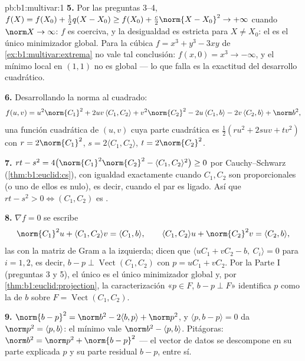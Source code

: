 \begin{solution}{pb:b1:multivar:1}
\textbf{5.} Por las preguntas 3--4, $f(X) = f(X_0) + \frac12 q(X -
X_0) \geq f(X_0) + \frac c2\norm{X - X_0}^2 \to +\infty$ cuando
$\norm X \to \infty$: $f$ es coerciva, y la desigualdad es
estricta para $X \neq X_0$: el  es el único minimizador
global. Para la cúbica $f = x^3 + y^3 - 3xy$ de
\cref{ex:b1:multivar:extrema} no vale tal conclusión: $f(x,0)
= x^3 \to -\infty$, y el mínimo local en $(1,1)$ no es
global --- lo que falla es la exactitud del desarrollo cuadrático.

\textbf{6.} Desarrollando la norma al cuadrado:
\[
f(u,v) = u^2\norm{C_1}^2 + 2uv\,\langle C_1, C_2\rangle +
v^2\norm{C_2}^2 - 2u\,\langle C_1, b\rangle - 2v\,\langle C_2,
b\rangle + \norm b^2 ,
\]
una función cuadrática de $(u, v)$ cuya parte cuadrática es
$\frac12(ru^2 + 2suv + tv^2)$ con $r = 2\norm{C_1}^2$, $s =
2\langle C_1, C_2\rangle$, $t = 2\norm{C_2}^2$.

\textbf{7.} $rt - s^2 = 4\bigl(\norm{C_1}^2\norm{C_2}^2 -
\langle C_1, C_2\rangle^2\bigr) \geq 0$ por Cauchy--Schwarz
(\cref{thm:b1:euclid:cs}), con igualdad exactamente cuando $C_1, C_2$
son proporcionales (o uno de ellos es nulo), es decir, cuando el par es
ligado. Así que $rt - s^2 > 0 \iff (C_1, C_2)$ es .

\textbf{8.} $\nabla f = 0$ se escribe
\[
\norm{C_1}^2 u + \langle C_1, C_2\rangle v = \langle C_1,
b\rangle,
\qquad
\langle C_1, C_2\rangle u + \norm{C_2}^2 v = \langle C_2,
b\rangle,
\]
las  con la matriz de Gram a la izquierda; dicen que
$\langle uC_1 + vC_2 - b,\ C_i\rangle = 0$ para $i = 1, 2$, es decir,
$b - p \perp \operatorname{Vect}(C_1, C_2)$ con $p = uC_1 +
vC_2$. Por la Parte I (preguntas 3 y 5), el único  es
el único minimizador global y, por
\cref{thm:b1:euclid:projection}, la caracterización «$p \in
F$, $b - p \perp F$» identifica $p$ como la  de $b$ sobre $F = \operatorname{Vect}(C_1, C_2)$.

\textbf{9.} $\norm{b - p}^2 = \norm b^2 - 2\langle b, p\rangle +
\norm p^2$, y $\langle p, b - p\rangle = 0$ da $\norm p^2 =
\langle p, b\rangle$: el mínimo vale $\norm b^2 - \langle p,
b\rangle$. Pitágoras: $\norm b^2 = \norm p^2 + \norm{b - p}^2$
--- el vector de datos se descompone en su parte explicada $p$ y su
parte residual $b - p$,  entre sí.


\end{solution}
